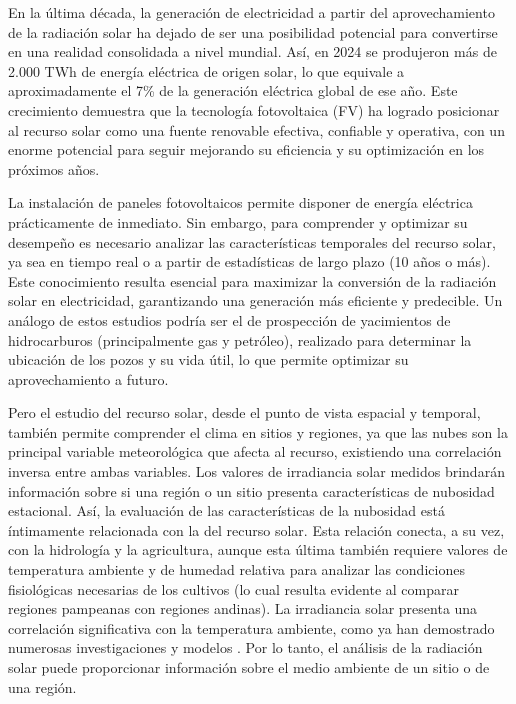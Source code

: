 En la última década, la generación de electricidad a partir del aprovechamiento de la radiación solar ha dejado de ser una posibilidad potencial para convertirse en una realidad consolidada a nivel mundial. Así, en 2024 se produjeron más de 2.000 TWh de energía eléctrica de origen solar, lo que equivale a aproximadamente el 7\% de la generación eléctrica global de ese año. Este crecimiento demuestra que la tecnología fotovoltaica (FV) ha logrado posicionar al recurso solar como una fuente renovable efectiva, confiable y operativa, con un enorme potencial para seguir mejorando su eficiencia y su optimización en los próximos años.


La instalación de paneles fotovoltaicos permite disponer de energía eléctrica prácticamente de inmediato. Sin embargo, para comprender y optimizar su desempeño es necesario analizar las características temporales del recurso solar, ya sea en tiempo real o a partir de estadísticas de largo plazo (10 años o más). Este conocimiento resulta esencial para maximizar la conversión de la radiación solar en electricidad, garantizando una generación más eficiente y predecible. Un análogo de estos estudios podría ser el de prospección de yacimientos de hidrocarburos (principalmente gas y petróleo), realizado para determinar la ubicación de los pozos y su vida útil, lo que permite optimizar su aprovechamiento a futuro.

Pero el estudio del recurso solar, desde el punto de vista espacial y temporal, también permite comprender el clima en sitios y regiones, ya que las nubes son la principal variable meteorológica que afecta al recurso, existiendo una correlación inversa entre ambas variables. Los valores de irradiancia solar medidos brindarán información sobre si una región o un sitio presenta características de nubosidad estacional. Así, la evaluación de las características de la nubosidad está íntimamente relacionada con la del recurso solar. Esta relación conecta, a su vez, con la hidrología y la agricultura, aunque esta última también requiere valores de temperatura ambiente y de humedad relativa para analizar las condiciones fisiológicas necesarias de los cultivos (lo cual resulta evidente al comparar regiones pampeanas con regiones andinas). La irradiancia solar presenta una correlación significativa con la temperatura ambiente, como ya han demostrado numerosas investigaciones y modelos \citep{ QIU2022,ALMOROX2011,6477329}. Por lo tanto, el análisis de la radiación solar puede proporcionar información sobre el medio ambiente de un sitio o de una región.


